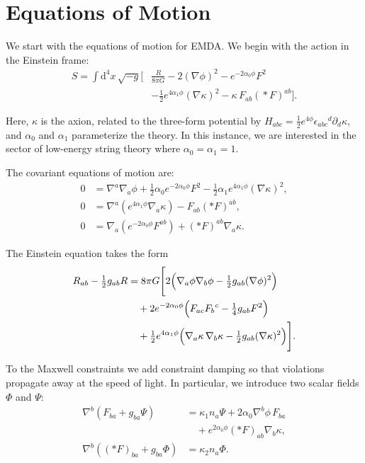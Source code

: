 \section{Equations of Motion}
\label{sec:appx:eom}

We start with the equations of motion for EMDA. We begin with the action in the Einstein frame:
\begin{equation}
\begin{aligned}
S=\int \mathrm{d}^4 x\,\sqrt{-g}\Big[
&\frac{R}{8\pi G}-2(\nabla\phi)^2-e^{-2\alpha_0\phi}F^2\\
&-\tfrac12 e^{4\alpha_1\phi}(\nabla\kappa)^2-\kappa\,F_{ab}({}*F)^{ab}
\Big].
\end{aligned}
\end{equation}

Here, $\kappa$ is the axion, related to the three-form potential by $H_{abc}= \frac{1}{2}e^{4\phi}\epsilon_{abc}{}^{d}\partial_d \kappa$, and $\alpha_0$ and $\alpha_1$ parameterize the theory. In this instance, we are interested in the sector of low-energy string theory where $\alpha_0 = \alpha_1 = 1$.  

The covariant equations of motion are:
\begin{align}
0 &= \nabla^a \nabla_a \phi
   + \tfrac{1}{2}\alpha_0 e^{-2\alpha_0 \phi} F^2
   - \tfrac{1}{2}\alpha_1 e^{4\alpha_1 \phi} (\nabla \kappa)^2, \label{eq:phi} \\[1ex]
0 &= \nabla^a \!\left( e^{4\alpha_1 \phi} \nabla_a \kappa \right)
   - F_{ab} (\ast F)^{ab}, \label{eq:kappa} \\[1ex]
0 &= \nabla_a \!\left( e^{-2\alpha_0 \phi} F^{ab} \right)
   + (\ast F)^{ab} \nabla_a \kappa. \label{eq:Maxwell}
\end{align}

The Einstein equation takes the form
\begin{align}
R_{ab} - \tfrac{1}{2} g_{ab} R 
&= 8 \pi G \Bigg[
   2\Big(\nabla_a \phi \nabla_b \phi 
   - \tfrac{1}{2} g_{ab} (\nabla \phi)^2\Big) \notag \\
&\quad + 2 e^{-2\alpha_0 \phi} 
   \Big(F_{ac} F_b{}^c - \tfrac{1}{4} g_{ab} F^2 \Big) \notag \\
&\quad + \tfrac{1}{2} e^{4\alpha_1 \phi} 
   \Big(\nabla_a \kappa \, \nabla_b \kappa 
   - \tfrac{1}{2} g_{ab} (\nabla \kappa)^2 \Big)
   \Bigg]. \label{eq:Einstein}
\end{align}

To the Maxwell constraints we add constraint damping so that violations propagate away at the speed of light. In particular, we introduce two scalar fields $\Phi$ and $\Psi$:
\begin{align}
\nabla^{b}\left(F_{ba} + g_{ba}\Psi \right) 
  &= \kappa_{1} n_{a} \Psi 
     + 2 \alpha_{0} \nabla^{b}\phi\, F_{ba} \nonumber \\
  &\quad + e^{2\alpha_0 \phi} (*F)_{ab}\nabla_b \kappa, \\[6pt]
\nabla^{b}\!\left( (\ast F)_{ba} + g_{ba}\Phi \right) 
  &= \kappa_{2} n_{a} \Phi .
\end{align}

